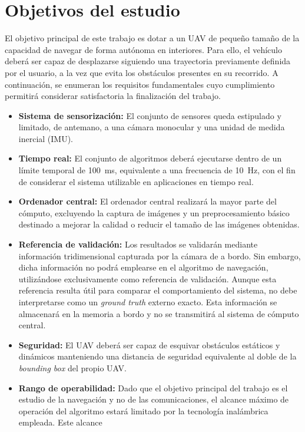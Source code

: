 \section{Objetivos del estudio}
    El objetivo principal de este trabajo es dotar a un UAV de pequeño tamaño de la capacidad de navegar de 
    forma autónoma en interiores. Para ello, el vehículo deberá ser capaz de desplazarse siguiendo una trayectoria previamente 
    definida por el usuario, a la vez que evita los obstáculos presentes en su recorrido. A continuación, se enumeran los requisitos 
    fundamentales cuyo cumplimiento permitirá considerar satisfactoria la finalización del trabajo.

    \begin{itemize}
        \item \textbf{Sistema de sensorización:} El conjunto de sensores queda estipulado y limitado, de antemano, a una cámara monocular 
        y una unidad de medida inercial (IMU).
        \item \textbf{Tiempo real:} El conjunto de algoritmos deberá ejecutarse dentro de un límite temporal de 100~ms, equivalente a una 
        frecuencia de 10~Hz, con el fin de considerar el sistema utilizable en aplicaciones en tiempo real.
        \item \textbf{Ordenador central:} El ordenador central realizará la mayor parte del cómputo, excluyendo la captura de imágenes y un 
        preprocesamiento básico destinado a mejorar la calidad o reducir el tamaño de las imágenes obtenidas.
        \item \textbf{Referencia de validación:} Los resultados se validarán mediante información tridimensional capturada por la cámara de a bordo. Sin 
        embargo, dicha información no podrá emplearse en el algoritmo de navegación, utilizándose exclusivamente como referencia de validación. Aunque esta referencia resulta útil para comparar el comportamiento del sistema, no debe interpretarse como un \textit{ground truth} externo exacto. 
        Esta información se almacenará en la memoria a bordo y no se transmitirá al sistema de cómputo central.
        \item \textbf{Seguridad:} El UAV deberá ser capaz de esquivar obstáculos estáticos y dinámicos manteniendo una distancia de 
        seguridad equivalente al doble de la \textit{bounding box} del propio UAV.
        \item \textbf{Rango de operabilidad:} Dado que el objetivo principal del trabajo es el estudio de la navegación y no de las 
        comunicaciones, el alcance máximo de operación del algoritmo estará limitado por la tecnología inalámbrica empleada. Este alcance 

\end{itemize}
